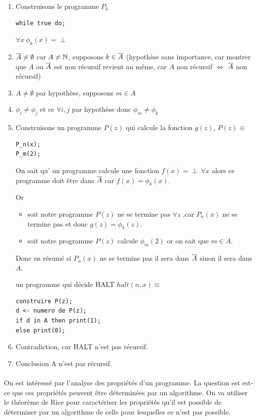 \begin{enumerate}
	\item Construisons le programme $P_k$
\begin{lstlisting}
while true do;				
\end{lstlisting}
	$\forall x \ \phi_k(x) = \perp$
	\item $\overline{A}\neq \emptyset$ car $A \neq \mathbb{N}$,
	supposons $k\in \overline{A}$ (hypothèse sans importance, car montrer que
	$A$ ou $\overline{A}$ est non récursif revient au même, car $A$ non
	récursif $ \Leftrightarrow $ $\overline{A}$ non récursif) \\
	\item $A\neq \emptyset$ par hypothèse, supposons $m\in A$
	\item $\phi_i \neq \phi_j$ et ce $\forall i,j$ par hypothèse donc
		$\phi_m \neq \phi_k$
	\item Construisons un programme $P(z)$ qui calcule la fonction $g(z)$, 
		$P(z) \equiv $
\begin{lstlisting}
P_n(x);
P_m(2);
\end{lstlisting}
	\begin{myrem}
		On sait qu’ un programme calcule une fonction $
		f(x)=\perp \ \forall x$ alors ce programme doit être dans $\overline{A}$ car
		$f(x) =\phi_k(x)$.

		Or 
		\begin{itemize}
			\item soit notre programme $P(z)$ ne se termine pas $\forall
			z$ ,car $P_n(x)$ ne se termine pas et donc $g(z) =
			\phi_k(z)$.

		\item soit notre programme $P(z)$ calcule $\phi_m(2)$ or on
			sait que $m\in A$.
		\end{itemize}
		Donc en résumé si $P_n(x)$ ne se termine pas il sera dans
		$\overline{A}$ sinon il sera dans $A$.
	\end{myrem}	
	un programme qui décide HALT $halt(n,x) \equiv $
\begin{lstlisting}
construire P(z);
d <- numero de P(z);
if d in A then print(1);
else print(0);
\end{lstlisting}
	\item Contradiction, car HALT n'est pas récursif.
	\item Conclusion A n'est pas récursif.
\end{enumerate}

\paragraph{} On est intéressé par l'analyse des propriétés d'un programme. La 
question est est-ce que ces propriétés peuvent être déterminées par un 
algorithme. On va utiliser le théorème de Rice pour caractériser les propriétés 
qu'il est possible de déterminer par un algorithme de celle pour lesquelles ce 
n'est pas possible.


